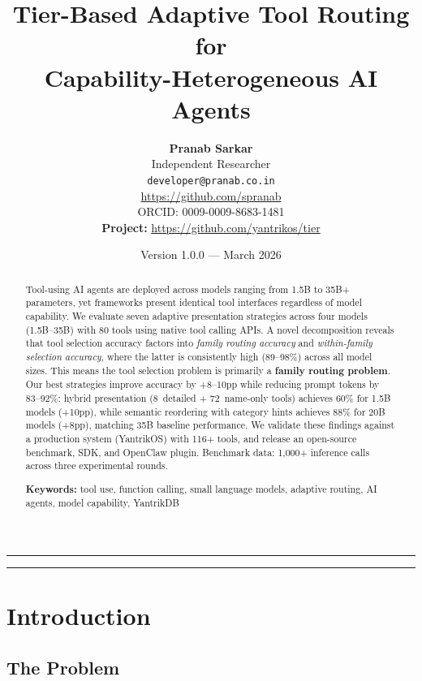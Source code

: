 \documentclass[11pt]{article}
\title{\textbf{Tier-Based Adaptive Tool Routing for\\Capability-Heterogeneous AI Agents}}
\author{%
  \textbf{Pranab Sarkar}\\
  Independent Researcher\\
  \texttt{developer@pranab.co.in}\\
  \url{https://github.com/spranab}\\[0.5em]
  \small ORCID: 0009-0009-8683-1481\\[1em]
  \small\textbf{Project:} \url{https://github.com/yantrikos/tier}
}
\date{Version 1.0.0 --- March 2026}
\begin{document}
\maketitle

\begin{center}
  \rule{0.5\textwidth}{0.4pt}
\end{center}

\begin{abstract}
\noindent Tool-using AI agents are deployed across models ranging from 1.5B to 35B+ parameters, yet frameworks present identical tool interfaces regardless of model capability. We evaluate seven adaptive presentation strategies across four models (1.5B--35B) with 80 tools using native tool calling APIs. A novel decomposition reveals that tool selection accuracy factors into \emph{family routing accuracy} and \emph{within-family selection accuracy}, where the latter is consistently high (89--98\%) across all model sizes. This means the tool selection problem is primarily a \textbf{family routing problem}. Our best strategies improve accuracy by +8--10pp while reducing prompt tokens by 83--92\%: hybrid presentation (8~detailed + 72~name-only tools) achieves 60\% for 1.5B models (+10pp), while semantic reordering with category hints achieves 88\% for 20B models (+8pp), matching 35B baseline performance. We validate these findings against a production system (YantrikOS) with 116+ tools, and release an open-source benchmark, SDK, and OpenClaw plugin. Benchmark data: 1,000+ inference calls across three experimental rounds.

\medskip
\noindent\textbf{Keywords:} tool use, function calling, small language models, adaptive routing, AI agents, model capability, YantrikDB
\end{abstract}

\begin{center}
  \rule{0.5\textwidth}{0.4pt}
\end{center}

\vspace{1em}
\twocolumn

\section{Introduction}

\subsection{The Problem}
\end{document}
